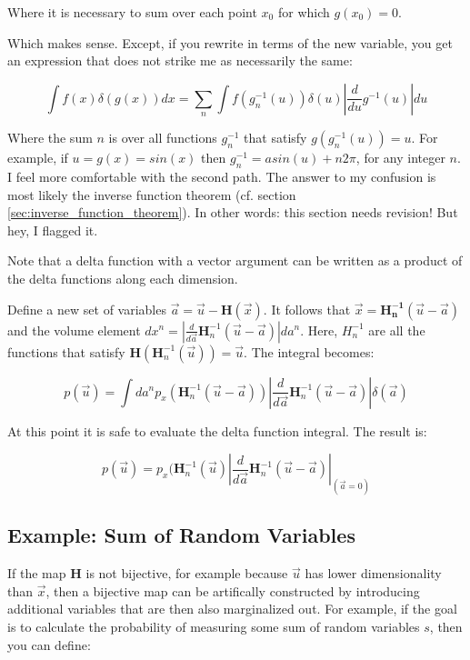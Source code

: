 Where it is necessary to sum over each point $x_0$ for which $g(x_0) = 0$.

Which makes sense. Except, if you rewrite in terms of the new variable, you get an expression that does not strike me as necessarily the same:

\begin{equation}
\int f(x) \delta(g(x))dx = \sum_{n}\int f(g_n^{-1}(u)) \delta(u) \left|\frac{d}{du}g^{-1}(u)\right|du
\end{equation}

Where the sum $n$ is over all functions $g_n^{-1}$ that satisfy $g(g_n^{-1}(u)) = u$. For example, if $u = g(x) = sin(x)$ then $g_n^{-1} = asin(u) + n2\pi$, for any integer $n$. I feel more comfortable with the second path. The answer to my confusion is most likely the inverse function theorem (cf. section \ref{sec:inverse_function_theorem}). In other words: this section needs revision! But hey, I flagged it.

Note that a delta function with a vector argument can be written as a product of the delta functions along each dimension.

Define a new set of variables $\vec{a} = \vec{u} - \mathbf{H}(\vec{x})$. It follows that $\vec{x} = \mathbf{H_n^{-1}}(\vec{u}-\vec{a})$ and the volume element $dx^n = \left| \frac{d}{d\vec{a}}\mathbf{H}_n^{-1}(\vec{u}-\vec{a})\right|da^n$. Here, $H^{-1}_n$ are all the functions that satisfy $\mathbf{H}(\mathbf{H}_n^{-1}(\vec{u})) = \vec{u}$. The integral becomes:

\begin{equation}
p(\vec{u}) = \int da^n p_x(\mathbf{H}^{-1}_n(\vec{u}-\vec{a}))\left| \frac{d}{d\vec{a}}\mathbf{H}_n^{-1}(\vec{u}-\vec{a})\right| \delta(\vec{a})
\end{equation}

At this point it is safe to evaluate the delta function integral. The result is:

\begin{equation}
p(\vec{u}) = p_x(\mathbf{H}^{-1}_n(\vec{u})\left| \frac{d}{d\vec{a}}\mathbf{H}_n^{-1}(\vec{u}-\vec{a})\right|_{(\vec{a}=0)}
\end{equation}

\subsection{Example: Sum of Random Variables}
If the map $\mathbf{H}$ is not bijective, for example because $\vec{u}$ has lower dimensionality than $\vec{x}$, then a bijective map can be artifically constructed by introducing additional variables that are then also marginalized out. For example, if the goal is to calculate the probability of measuring some sum of random variables $s$, then you can define:

